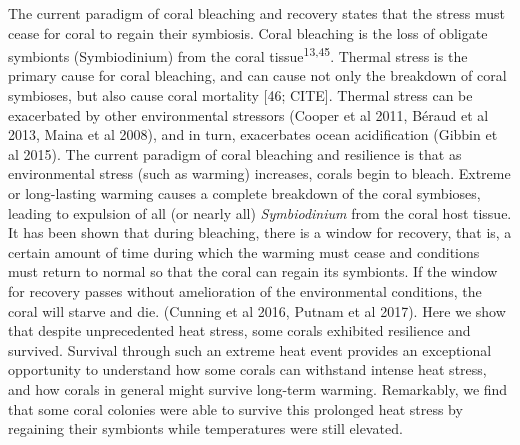 \documentclass[]{article}
\begin{document}
The current paradigm of coral bleaching and recovery states that the
stress must cease for coral to regain their symbiosis. Coral bleaching
is the loss of obligate symbionts (Symbiodinium) from the coral
tissue\textsuperscript{13,45}. Thermal stress is the primary cause for
coral bleaching, and can cause not only the breakdown of coral
symbioses, but also cause coral mortality {[}46; CITE{]}. Thermal stress
can be exacerbated by other environmental stressors (Cooper et al 2011,
Béraud et al 2013, Maina et al 2008), and in turn, exacerbates ocean
acidification (Gibbin et al 2015). The current paradigm of coral
bleaching and resilience is that as environmental stress (such as
warming) increases, corals begin to bleach. Extreme or long-lasting
warming causes a complete breakdown of the coral symbioses, leading to
expulsion of all (or nearly all) \emph{Symbiodinium} from the coral host
tissue. It has been shown that during bleaching, there is a window for
recovery, that is, a certain amount of time during which the warming
must cease and conditions must return to normal so that the coral can
regain its symbionts. If the window for recovery passes without
amelioration of the environmental conditions, the coral will starve and
die. (Cunning et al 2016, Putnam et al 2017). Here we show that despite
unprecedented heat stress, some corals exhibited resilience and
survived. Survival through such an extreme heat event provides an
exceptional opportunity to understand how some corals can withstand
intense heat stress, and how corals in general might survive long-term
warming. Remarkably, we find that some coral colonies were able to
survive this prolonged heat stress by regaining their symbionts while
temperatures were still elevated.
\end{document}
